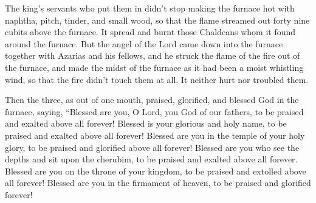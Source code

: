  The king's servants who put them in didn't stop making the
furnace hot with naphtha, pitch, tinder, and small wood, 
so that the flame streamed out forty nine cubits above the furnace.
 It spread and burnt those Chaldeans whom it found around
the furnace.  But the angel of the Lord came down into the
furnace together with Azarias and his fellows, and he struck the flame
of the fire out of the furnace,  and made the midst of the
furnace as it had been a moist whistling wind, so that the fire didn't
touch them at all. It neither hurt nor troubled them.

 Then the three, as out of one mouth, praised, glorified,
and blessed God in the furnace, saying,  ``Blessed are you,
O Lord, you God of our fathers, to be praised and exalted above all
forever!  Blessed is your glorious and holy name, to be
praised and exalted above all forever!  Blessed are you in
the temple of your holy glory, to be praised and glorified above all
forever!  Blessed are you who see the depths and sit upon
the cherubim, to be praised and exalted above all forever. 
Blessed are you on the throne of your kingdom, to be praised and
extolled above all forever!  Blessed are you in the
firmament of heaven, to be praised and glorified forever!

